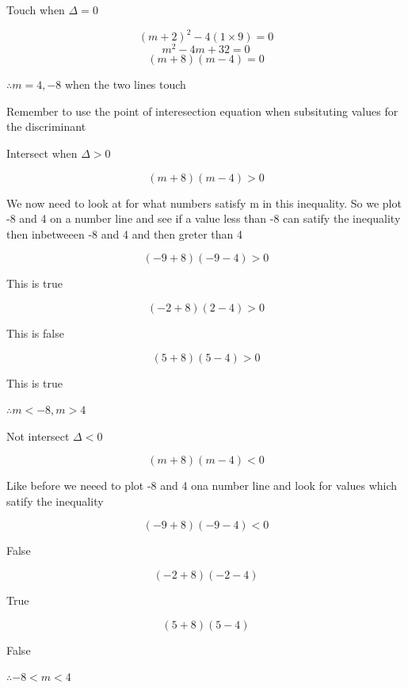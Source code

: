 \documentclass{report}
\begin{document}
\begin{center}
    Touch when  $\Delta = 0$

\end{center}
$$(m+2)^{2}-4(1\times 9) = 0 $$
$$m^{2}-4m+32=0$$
$$(m+8)(m-4)= 0$$
\begin{center}
    $\therefore m = 4,-8$ when the two lines touch
\end{center}
\begin{note}
    Remember to use the point of interesection equation when subsituting values for the discriminant
\end{note}
\begin{center}
    Intersect when $\Delta >0$
\end{center}
$$(m+8)(m-4)> 0$$
\begin{center}
    We now need to look at for what numbers satisfy m in this inequality. So we plot -8 and 4 on a number line and see if a value less than -8 can satify the inequality then inbetweeen -8 and 4 and then greter than 4
\end{center}
$$(-9+8)(-9-4)>0$$
\begin{center}
    This is true
\end{center}
$$(-2+8)(2-4)>0$$
\begin{center}
    This is false
\end{center}
$$(5+8)(5-4)>0$$
\begin{center}
    This is true
\end{center}

\begin{center}
    $\therefore m<-8, m>4$
\end{center}

\begin{center}
    Not intersect $\Delta < 0$
\end{center}
$$(m+8)(m-4)<0$$
\begin{center}
    Like before we neeed to plot  -8 and 4 ona number line and look for values which satify the inequality
\end{center}
$$(-9+8)(-9-4)<0$$
\begin{center}
    False
\end{center}
$$(-2+8)(-2-4)$$
\begin{center}
    True
\end{center}
$$(5+8)(5-4)$$
\begin{center}
    False
\end{center}
\begin{center}
    $\therefore -8<m<4$
\end{center}
\end{document}
